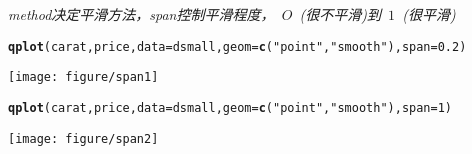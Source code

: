 \documentclass{article}\usepackage[]{graphicx}\usepackage[]{color}
\makeatletter
\def\maxwidth{ %
  \ifdim\Gin@nat@width>\linewidth
    \linewidth
  \else
    \Gin@nat@width
  \fi
}
\newcommand{\hlnum}[1]{\textcolor[rgb]{0.686,0.059,0.569}{#1}}%
\newcommand{\hlstr}[1]{\textcolor[rgb]{0.192,0.494,0.8}{#1}}%
\newcommand{\hlstd}[1]{\textcolor[rgb]{0.345,0.345,0.345}{#1}}%
\newcommand{\hlkwc}[1]{\textcolor[rgb]{0.333,0.667,0.333}{#1}}%
\newcommand{\hlkwd}[1]{\textcolor[rgb]{0.737,0.353,0.396}{\textbf{#1}}}%
\newenvironment{kframe}{%
 \def\at@end@of@kframe{}%
 \ifinner\ifhmode%
  \def\at@end@of@kframe{\end{minipage}}%
  \begin{minipage}{\columnwidth}%
 \fi\fi%
 \def\FrameCommand##1{\hskip\@totalleftmargin \hskip-\fboxsep
 \colorbox{shadecolor}{##1}\hskip-\fboxsep
     \hskip-\linewidth \hskip-\@totalleftmargin \hskip\columnwidth}%
 \MakeFramed {\advance\hsize-\width
   \@totalleftmargin\z@ \linewidth\hsize
   \@setminipage}}%
 {\par\unskip\endMakeFramed%
 \at@end@of@kframe}
\newenvironment{knitrout}{}{} %
\makeatother
\begin{document}
\begin{CJK*}{UTF8}{gkai}
\begin{knitrout}
\end{knitrout}
\em{method}决定平滑方法，\em{span}控制平滑程度，~$O$~(很不平滑)到~$1$~(很平滑)
\begin{knitrout}
\color{fgcolor}\begin{kframe}
\begin{alltt}
\hlkwd{qplot}\hlstd{(carat, price,} \hlkwc{data} \hlstd{= dsmall,} \hlkwc{geom} \hlstd{=} \hlkwd{c}\hlstd{(}\hlstr{"point"}\hlstd{,} \hlstr{"smooth"}\hlstd{),} \hlkwc{span} \hlstd{=} \hlnum{0.2}\hlstd{)}
\end{alltt}


{\ttfamily\noindent\itshape{}}\end{kframe}
\texttt{[image: figure/span1]} 
\begin{kframe}\begin{alltt}
\hlkwd{qplot}\hlstd{(carat, price,} \hlkwc{data} \hlstd{= dsmall,} \hlkwc{geom} \hlstd{=} \hlkwd{c}\hlstd{(}\hlstr{"point"}\hlstd{,} \hlstr{"smooth"}\hlstd{),} \hlkwc{span} \hlstd{=} \hlnum{1}\hlstd{)}
\end{alltt}


{\ttfamily\noindent\itshape{}}\end{kframe}
\texttt{[image: figure/span2]} 


\end{knitrout}
\end{CJK*}
\end{document}
